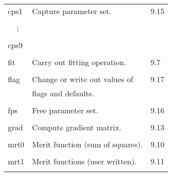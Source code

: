 \begin{center}
\begin{tabular}{lll}
\hspace{1.5em}cps1   &  Capture parameter set.         &          \hspace{2em}9.15\\
\vspace{-7mm}& &\\
\hspace{1.5em}\ \ \,$\vdots$ & &\\
\vspace{-7mm}& &\\
\hspace{1.5em}cps9 & & \\
\vspace{-3mm}& &\\
\hspace{1.5em}fit    &     Carry out fitting operation.         &  \hspace{2em}9.7\\
\vspace{-3mm}& &\\
\hspace{1.5em}flag   &     Change or write out values of &       \hspace{2em}9.17\\
           &   flags and defaults. &\\
\vspace{-3mm}& &\\
\hspace{1.5em}fps     &    Free parameter set.              &    \hspace{2em}9.16\\
\vspace{-3mm}& &\\
\hspace{1.5em}grad    &    Compute gradient matrix.            & \hspace{2em}9.13\\
\vspace{-3mm}& &\\
\hspace{1.5em}mrt0   &     Merit function (sum of squares).   &   \hspace{2em}9.10\\
\vspace{-3mm}& &\\
\hspace{1.5em}mrt1    &    Merit functions (user written).   &     \hspace{2em}9.11\\
\vspace{-7mm}& &\\

\end{tabular}
\end{center}
